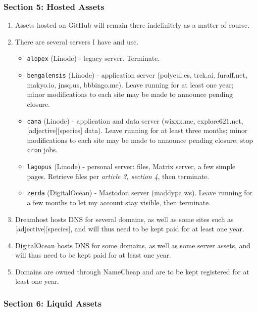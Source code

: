 \hypertarget{section-5-hosted-assets}{%
\subsubsection*{Section 5: Hosted Assets}\label{section-5-hosted-assets}}

\begin{enumerate}
\def\labelenumi{\arabic{enumi}.}
\tightlist
\item
  Assets hosted on GitHub will remain there indefinitely as a matter of course.
\item
  There are several servers I have and use.

  \begin{itemize}
  \tightlist
  \item
    \texttt{alopex} (Linode) - legacy server. Terminate.
  \item
    \texttt{bengalensis} (Linode) - application server (polycul.es, trck.ai, furaff.net, makyo.io, jnsq.us, bbbingo.me). Leave running for at least one year; minor modifications to each site may be made to announce pending closure.
  \item
    \texttt{cana} (Linode) - application and data server (wixxx.me, explore621.net, {[}adjective{]}{[}species{]} data). Leave running for at least three months; minor modifications to each site may be made to announce pending closure; stop \texttt{cron} jobs.
  \item
    \texttt{lagopus} (Linode) - personal server: files, Matrix server, a few simple pages. Retrieve files per \emph{article 3, section 4}, then terminate.
  \item
    \texttt{zerda} (DigitalOcean) - Mastodon server (maddypa.ws). Leave running for a few months to let my account stay visible, then terminate.
  \end{itemize}
\item
  Dreamhost hosts DNS for several domains, as well as some sites such as {[}adjective{]}{[}species{]}, and will thus need to be kept paid for at least one year.
\item
  DigitalOcean hosts DNS for some domains, as well as some server assets, and will thus need to be kept paid for at least one year.
\item
  Domains are owned through NameCheap and are to be kept registered for at least one year.
\end{enumerate}

\hypertarget{section-6-liquid-assets}{%
\subsubsection*{Section 6: Liquid Assets}\label{section-6-liquid-assets}}

